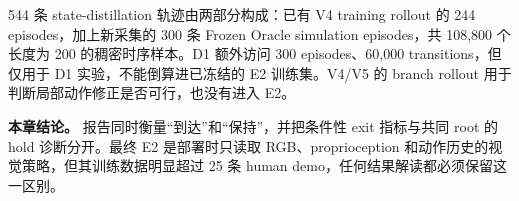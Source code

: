 544 条 state-distillation 轨迹由两部分构成：已有 V4 training rollout 的 244 episodes，加上新采集的 300 条 Frozen Oracle simulation episodes，共 108,800 个长度为 200 的稠密时序样本。D1 额外访问 300 episodes、60,000 transitions，但仅用于 D1 实验，不能倒算进已冻结的 E2 训练集。V4/V5 的 branch rollout 用于判断局部动作修正是否可行，也没有进入 E2。

\textbf{本章结论。} 报告同时衡量``到达''和``保持''，并把条件性 exit 指标与共同 root 的 hold 诊断分开。最终 E2 是部署时只读取 RGB、proprioception 和动作历史的视觉策略，但其训练数据明显超过 25 条 human demo，任何结果解读都必须保留这一区别。

\autocite{gymnasiumrobotics2024,minari2024}

